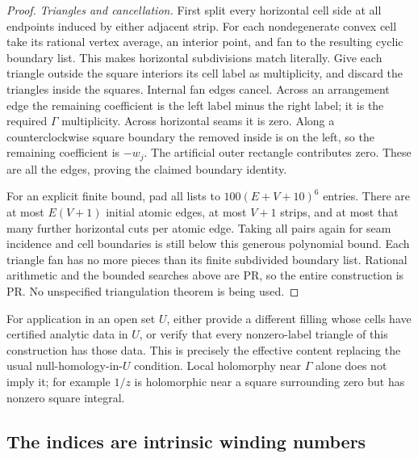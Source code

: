 \documentclass[11pt]{article}
\theoremstyle{definition}
\begin{document}
\begin{proof}
\emph{Triangles and cancellation.} First split every horizontal cell
side at all endpoints induced by either adjacent strip. For each
nondegenerate convex cell take its rational vertex average, an interior
point, and fan to the resulting cyclic boundary list. This makes
horizontal subdivisions match literally. Give each triangle outside
the square interiors its cell label as multiplicity, and discard the
triangles inside the squares. Internal fan edges cancel. Across an
arrangement edge the remaining coefficient is the left label minus
the right label; it is the required \(\Gamma\) multiplicity. Across
horizontal seams it is zero. Along a counterclockwise square boundary
the removed inside is on the left, so the remaining coefficient is
\(-w_j\). The artificial outer rectangle contributes zero. These are
all the edges, proving the claimed boundary identity.

For an explicit finite bound, pad all lists to
\(100(E+V+10)^6\) entries. There are at most \(E(V+1)\) initial atomic
edges, at most \(V+1\) strips, and at most that many further horizontal
cuts per atomic edge. Taking all pairs again for seam incidence and
cell boundaries is still below this generous polynomial bound.
Each triangle fan has no more pieces than its finite subdivided boundary
list. Rational arithmetic and the bounded searches above are PR, so
the entire construction is PR. No unspecified triangulation theorem is
being used.
\end{proof}

For application in an open set \(U\), either provide a different
filling whose cells have certified analytic data in \(U\), or verify
that every nonzero-label triangle of this construction has those data.
This is precisely the effective content replacing the usual
null-homology-in-\(U\) condition. Local holomorphy near \(\Gamma\) alone
does not imply it; for example \(1/z\) is holomorphic near a square
surrounding zero but has nonzero square integral.

\subsection{The indices are intrinsic winding numbers}
\end{document}
